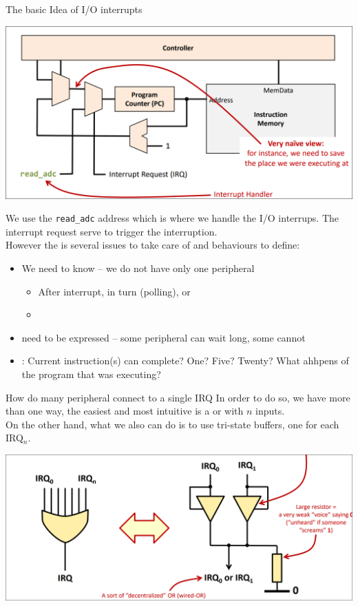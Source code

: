 \begin{parag}{The basic Idea of I/O interrupts}
    \begin{center}
    \includegraphics[scale=0.2]{screenshots/2025-10-22_12.png}
    \end{center}
	We use the \texttt{read\_adc} address which is where we handle the I/O interrups. The interrupt request serve to trigger the interruption.\\
	However the is several issues to take care of and behaviours to define:
	\begin{itemize}
	    \item We need to know  -- we do not have only one peripheral
			\begin{itemize}
				\item After interrupt,  in turn (polling), or 
				\item {}
			\end{itemize}
		\item {} need to be expressed -- some peripheral can wait long, some cannot
		\item {}: Current instruction(s) can complete? One? Five? Twenty? What ahhpens of the program that was executing?
	\end{itemize}
	\begin{subparag}{How do many peripheral connect to a single IRQ}
	    In order to do so, we have more than one way, the easiest and most intuitive is a or with $n$ inputs.\\
		On the other hand, what we also can do is to use tri-state buffers, one for each IRQ$_n$.
	\end{subparag}
	\begin{center}
	\includegraphics[scale=0.2]{screenshots/2025-10-22_13.png}

\end{center}
\end{parag}
